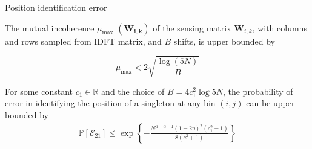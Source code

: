 \documentclass[10pt,xcolor=table]{beamer}
\newcommand{\mc}{\mathcal}
\newcommand{\mbb}{\mathbb}
\begin{document}
\begin{frame}{Position identification error}

\begin{lemma}
	The mutual incoherence $\mu_{\text{max}}$ $(\mathbf{W_{i,k}})$ of the sensing matrix $\mathbf{W}_{i,k}$, with columns and rows sampled from IDFT matrix, and  $B$ shifts, is upper bounded by
	
	\[ \mu_{\text{max}} < 2\sqrt{\frac{\log(5N)}{B}} \]
\end{lemma}

\begin{lemma}
	For some constant $c_1 \in \mathbb{R}$ and the choice of $B=4c_1^2\log 5N$,  the probability of error in identifying the position of a singleton at any bin $(i,j)$ can be upper bounded by
	\begin{align*}
	\mbb{P}[\mc{E}_{21}]\leq \exp\left\lbrace-\frac{N^{\mu+\alpha-1}(1-2\eta)^2(c_1^2-1)}{8(c_1^2+1)}\right\rbrace
	\end{align*}
\end{lemma}

\end{frame}

\end{document}
